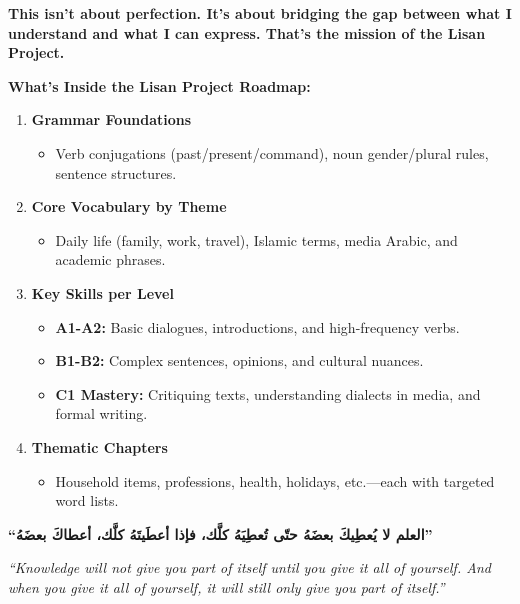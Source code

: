\documentclass[
  arabic,
  letterpaper,
  DIV=11,
  numbers=noendperiod]{scrartcl}
\providecommand{\tightlist}{%
  \setlength{\itemsep}{0pt}\setlength{\parskip}{0pt}}
\begin{document}
\textbf{This isn't about perfection. It's about bridging the gap between
what I understand and what I can express. That's the mission of the
Lisan Project.}

\textbf{What's Inside the Lisan Project Roadmap:}

\begin{enumerate}
\def\labelenumi{\arabic{enumi}.}
\tightlist
\item
  \textbf{Grammar Foundations}

  \begin{itemize}
  \tightlist
  \item
    Verb conjugations (past/present/command), noun gender/plural rules,
    sentence structures.
  \end{itemize}
\item
  \textbf{Core Vocabulary by Theme}

  \begin{itemize}
  \tightlist
  \item
    Daily life (family, work, travel), Islamic terms, media Arabic, and
    academic phrases.
  \end{itemize}
\item
  \textbf{Key Skills per Level}

  \begin{itemize}
  \tightlist
  \item
    \textbf{A1-A2:} Basic dialogues, introductions, and high-frequency
    verbs.
  \item
    \textbf{B1-B2:} Complex sentences, opinions, and cultural nuances.
  \item
    \textbf{C1 Mastery:} Critiquing texts, understanding dialects in
    media, and formal writing.
  \end{itemize}
\item
  \textbf{Thematic Chapters}

  \begin{itemize}
  \tightlist
  \item
    Household items, professions, health, holidays, etc.---each with
    targeted word lists.
  \end{itemize}
\end{enumerate}

\begin{tcolorbox}[enhanced jigsaw, title=\textcolor{quarto-callout-note-color}{\faInfo}\hspace{0.5em}{\textbf{Quote}}, toptitle=1mm, rightrule=.15mm, titlerule=0mm, opacityback=0, arc=.35mm, colbacktitle=quarto-callout-note-color!10!white, left=2mm, colback=white, coltitle=black, breakable, colframe=quarto-callout-note-color-frame, bottomtitle=1mm, bottomrule=.15mm, toprule=.15mm, opacitybacktitle=0.6, leftrule=.75mm]

\textbf{``العلم لا يُعطِيكَ بعضَهُ حتّى تُعطِيَهُ كلَّك، فإذا أعطَيتَهُ كلَّك، أعطاكَ
بعضَهُ''}

\emph{``Knowledge will not give you part of itself until you give it all
of yourself. And when you give it all of yourself, it will still only
give you part of itself.''}

\end{tcolorbox}
\end{document}
